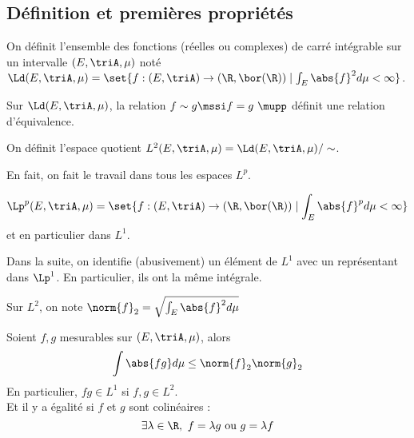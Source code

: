 \subsection{Définition et premières propriétés}

\begin{definition}
	On définit l'ensemble des fonctions (réelles ou complexes) de carré intégrable sur un intervalle $(E, \triA, \mu)$ noté
	$\Ld (E, \triA, \mu) = \set{ f: (E, \triA) \to (\R, \bor(\R)) \mid \int_E \abs{f}^2 d \mu < \infty }$.
\end{definition}


\begin{prop}
	Sur $\Ld (E, \triA, \mu)$, la relation $f \sim g \mssi f = g \ \mupp$ définit une relation d'équivalence.
\end{prop}

\begin{definition}
	On définit l'espace quotient $L^2(E, \triA, \mu) = \Ld (E, \triA, \mu) / \sim$.
\end{definition}

\begin{remarque}
	En fait, on fait le travail dans tous les espaces $L^p$.

	$$ \Lp^p (E, \triA, \mu) = \set{ f: (E, \triA) \to (\R, \bor(\R)) \mid \int_E \abs{f}^p d \mu < \infty }$$
	et en particulier dans $L^1$.
\end{remarque}

\begin{remarque}
	Dans la suite, on identifie (abusivement) un élément de $L^1$ avec un représentant dans $\Lp^1$.
	En particulier, ils ont la même intégrale.

	Sur $L^2$, on note $\norm{f}_2 = \sqrt{\int_E \abs{f}^2 d \mu}$
\end{remarque}


\begin{theorem}
	Soient $f, g$ mesurables sur $(E, \triA, \mu)$, alors
	$$\int \abs{fg} d \mu \leq \norm{f}_2 \norm{g}_2$$
	En particulier, $fg \in L^1$ si $f, g \in L^2$.\\
	Et il y a égalité si  $f$ et $g$ sont colinéaires :
	$$\exists \lambda \in \R, \ f = \lambda g \text{ ou } g = \lambda f$$
\end{theorem}

